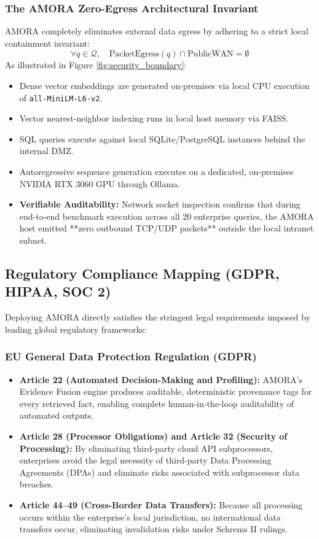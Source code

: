 \subsubsection{The AMORA Zero-Egress Architectural Invariant}
AMORA completely eliminates external data egress by adhering to a strict local containment invariant:
\begin{equation}
    \forall q \in \mathcal{Q}, \quad \text{PacketEgress}(q) \cap \text{PublicWAN} = \emptyset
\end{equation}
As illustrated in Figure \ref{fig:security_boundary}:
\begin{itemize}
    \item Dense vector embeddings are generated on-premises via local CPU execution of \texttt{all-MiniLM-L6-v2}.
    \item Vector nearest-neighbor indexing runs in local host memory via FAISS.
    \item SQL queries execute against local SQLite/PostgreSQL instances behind the internal DMZ.
    \item Autoregressive sequence generation executes on a dedicated, on-premises NVIDIA RTX 3060 GPU through Ollama.
    \item \textbf{Verifiable Auditability:} Network socket inspection confirms that during end-to-end benchmark execution across all 20 enterprise queries, the AMORA host emitted **zero outbound TCP/UDP packets** outside the local intranet subnet.

\end{itemize}

\subsection{Regulatory Compliance Mapping (GDPR, HIPAA, SOC 2)}
Deploying AMORA directly satisfies the stringent legal requirements imposed by leading global regulatory frameworks:

\subsubsection{EU General Data Protection Regulation (GDPR)}
\begin{itemize}
    \item \textbf{Article 22 (Automated Decision-Making and Profiling):} AMORA's Evidence Fusion engine produces auditable, deterministic provenance tags for every retrieved fact, enabling complete human-in-the-loop auditability of automated outputs.
    \item \textbf{Article 28 (Processor Obligations) and Article 32 (Security of Processing):} By eliminating third-party cloud API subprocessors, enterprises avoid the legal necessity of third-party Data Processing Agreements (DPAs) and eliminate risks associated with subprocessor data breaches.
    \item \textbf{Article 44--49 (Cross-Border Data Transfers):} Because all processing occurs within the enterprise's local jurisdiction, no international data transfers occur, eliminating invalidation risks under Schrems II rulings.
\end{itemize}

